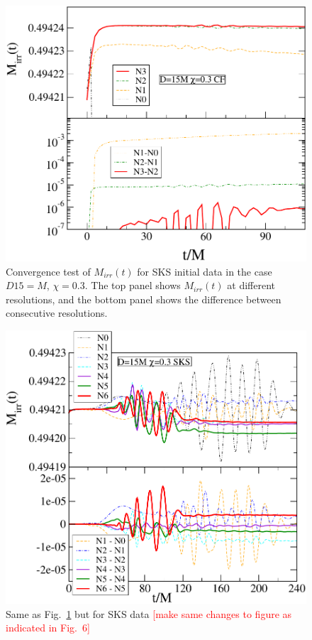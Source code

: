 \documentclass[aps,prd,amsmath,floatfix,twocolumn,superscriptaddress,nofootinbib,showpacs]{revtex4-1}
\theoremstyle{plain}
\theoremstyle{definition}
\newcommand{\red}[1]{\textcolor{Red}{#1}}
\begin{document}
\begin{figure}
 \includegraphics[scale=0.50]{CFMConvergence1}
  \caption{Convergence test of $M_{irr}(t)$ for SKS initial data in the
  case $D15=M$, $\chi=0.3$. The top panel shows $M_{irr}(t)$ at
  different resolutions, and the bottom panel shows the difference
  between consecutive resolutions.}
  \label{fig:CFMConvergence1}
\end{figure}

\begin{figure}[!htbp]
 \includegraphics[scale=0.50]{SKSMConvergence1}
  \caption{Same as Fig.~\ref{fig:CFMConvergence1} but for SKS data
    \red{[make same changes to figure as indicated in Fig.~6]}}

  \label{fig:SKSMConvergence1}
\end{figure}
\end{document}
